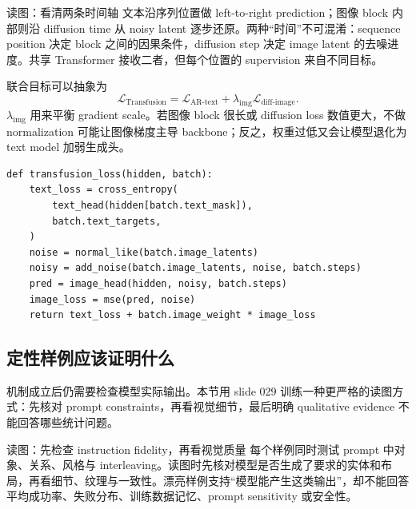 
\begin{knowledgebox}{读图：看清两条时间轴}
文本沿序列位置做 left-to-right prediction；图像 block 内部则沿 diffusion time 从 noisy latent 逐步还原。两种“时间”不可混淆：sequence position 决定 block 之间的因果条件，diffusion step 决定 image latent 的去噪进度。共享 Transformer 接收二者，但每个位置的 supervision 来自不同目标。
\end{knowledgebox}

联合目标可以抽象为
$$
\mathcal{L}_{\text{Transfusion}}
=\mathcal{L}_{\text{AR-text}}+\lambda_{\text{img}}\mathcal{L}_{\text{diff-image}}.
$$
$\lambda_{\text{img}}$ 用来平衡 gradient scale。若图像 block 很长或 diffusion loss 数值更大，不做 normalization 可能让图像梯度主导 backbone；反之，权重过低又会让模型退化为 text model 加弱生成头。

\begin{lstlisting}[caption={Transfusion 风格的 modality-aware joint objective}]
def transfusion_loss(hidden, batch):
    text_loss = cross_entropy(
        text_head(hidden[batch.text_mask]),
        batch.text_targets,
    )
    noise = normal_like(batch.image_latents)
    noisy = add_noise(batch.image_latents, noise, batch.steps)
    pred = image_head(hidden, noisy, batch.steps)
    image_loss = mse(pred, noise)
    return text_loss + batch.image_weight * image_loss
\end{lstlisting}


\subsection{定性样例应该证明什么}

机制成立后仍需要检查模型实际输出。本节用 slide 029 训练一种更严格的读图方式：先核对 prompt constraints，再看视觉细节，最后明确 qualitative evidence 不能回答哪些统计问题。


\begin{knowledgebox}{读图：先检查 instruction fidelity，再看视觉质量}
每个样例同时测试 prompt 中对象、关系、风格与 interleaving。读图时先核对模型是否生成了要求的实体和布局，再看细节、纹理与一致性。漂亮样例支持“模型能产生这类输出”，却不能回答平均成功率、失败分布、训练数据记忆、prompt sensitivity 或安全性。
\end{knowledgebox}

